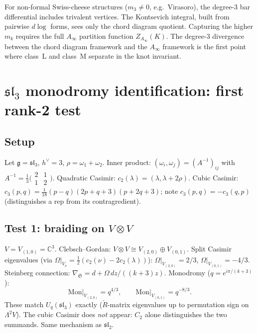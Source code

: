 \documentclass[11pt]{article}
\newcommand{\fg}{\mathfrak{g}}
\newcommand{\fsl}{\mathfrak{sl}}
\newcommand{\C}{\mathbb{C}}
\begin{document}
\begin{question}
\label{q:trefoil-beyond-affine}
For non-formal Swiss-cheese structures ($m_3 \ne 0$, e.g.\
Virasoro), the degree-$3$ bar differential includes trivalent
vertices.  The Kontsevich integral, built from pairwise $d\log$
forms, sees only the chord diagram quotient.  Capturing the
higher $m_k$ requires the full $A_\infty$ partition function
$Z_{A_\infty}(K)$.  The degree-$3$ divergence between the
chord diagram framework and the $A_\infty$ framework is
the first point where class~L and class~M separate in the
knot invariant.
\end{question}


\section{$\fsl_3$ monodromy identification: first rank-2 test}
\label{sec:sl3-monodromy-extraction}

\subsection*{Setup}
Let $\fg = \fsl_3$, $h^\vee = 3$, $\rho = \omega_1 + \omega_2$.
Inner product: $(\omega_i, \omega_j) = (A^{-1})_{ij}$ with
$A^{-1} = \frac{1}{3}\bigl(\begin{smallmatrix} 2 & 1 \\ 1 & 2
\end{smallmatrix}\bigr)$.
Quadratic Casimir: $c_2(\lambda) = (\lambda, \lambda + 2\rho)$.
Cubic Casimir: $c_3(p,q) = \tfrac{1}{18}(p-q)(2p+q+3)(p+2q+3)$;
note $c_3(p,q) = -c_3(q,p)$ (distinguishes a rep from its contragredient).

\subsection*{Test 1: braiding on $V \otimes V$}
$V = V_{(1,0)} = \C^3$.  Clebsch--Gordan:
$V \otimes V \cong V_{(2,0)} \oplus V_{(0,1)}$.
Split Casimir eigenvalues (via
$\Omega|_{V_\nu} = \tfrac{1}{2}(c_2(\nu) - 2c_2(\lambda))$):
$\Omega|_{V_{(2,0)}} = 2/3$, $\Omega|_{V_{(0,1)}} = -4/3$.
Steinberg connection: $\nabla_{\mathfrak{S}} = d + \Omega\,dz/((k+3)z)$.
Monodromy ($q = e^{i\pi/(k+3)}$):
\[
  \mathrm{Mon}\big|_{V_{(2,0)}} = q^{4/3},
  \qquad
  \mathrm{Mon}\big|_{V_{(0,1)}} = q^{-8/3}.
\]
These match $U_q(\fsl_3)$ exactly ($\check{R}$-matrix eigenvalues
up to permutation sign on $\Lambda^2 V$).
The cubic Casimir does \emph{not} appear: $C_2$ alone distinguishes
the two summands.  Same mechanism as $\fsl_2$.
\end{document}
